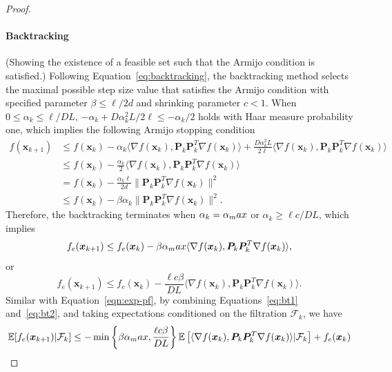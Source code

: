 \documentclass[10pt,a4paper]{amsart}
\newcommand{\Lip}{L}
\newcommand{\alphaMax}{\alpha_\textup{max}}
\begin{document}
\begin{proof}
\paragraph{Backtracking}
(Showing the existence of a feasible set such that the Armijo condition is satisfied.)
Following Equation~\eqref{eq:backtracking}, the backtracking method selects the maximal possible step size value that satisfies the Armijo condition with specified parameter $\beta \leq \ell/2d$ and shrinking parameter $c<1$. When $0\leq\alpha_k\leq \ell/D\Lip$, $-\alpha_k + D\alpha_k^2\Lip/2\ell\leq-\alpha_k/2$ holds with Haar measure probability one, which implies the following Armijo stopping condition
\begin{equation}
\begin{aligned}
f(\bm x_{k+1}) 
&\leq f(\bm x_k) -\alpha_k \langle \nabla f(\bm x_k), \bm P_k\bm P_k^T\nabla f(\bm x_k)\rangle + \frac{D\alpha_k^2\Lip}{2\ell}\langle \nabla f(\bm x_k), \bm P_k\bm P_k^T\nabla f(\bm x_k)\rangle\\
&\leq f(\bm x_k) - \frac{\alpha_k}{2}\langle \nabla f(\bm x_k), \bm P_k\bm P_k^T\nabla f(\bm x_k)\rangle\\
&= f(\bm x_k) - \frac{\alpha_k\ell}{2d}\lVert\bm P_k\bm P_k^T\nabla f(\bm x_k)\rVert^2\\
&\leq f(\bm x_k) - \beta\alpha_k\lVert\bm P_k\bm P_k^T\nabla f(\bm x_k)\rVert^2.
\end{aligned}
\end{equation}
Therefore, the backtracking terminates when $\alpha_k = \alphaMax$ or $\alpha_k \geq \ell c/D\Lip$, which implies
\begin{equation}
\label{eq:bt1}
f_e(\bm x_{k+1}) \leq f_e(\bm x_k) - \beta \alphaMax\langle \nabla f(\bm x_k), \bm P_k\bm P_k^T\nabla f(\bm x_k)\rangle,
\end{equation}
or 
\begin{equation}
\label{eq:bt2}
f_e(\bm x_{k+1}) \leq f_e(\bm x_k) - \frac{\ell c\beta}{D\Lip}\langle \nabla f(\bm x_k), \bm P_k\bm P_k^T\nabla f(\bm x_k)\rangle.
\end{equation}
Similar with Equation~\eqref{eqn:exp-pf}, by combining Equations~\eqref{eq:bt1} and~\eqref{eq:bt2}, and taking expectations conditioned on the filtration $\mathcal{F}_k$, we have
\begin{equation}
\label{eqn:pre-pl}
\begin{aligned}
\mathbb{E}[f_e(\bm x_{k+1})\vert\mathcal{F}_k]
&\leq -\min\left\{\beta \alphaMax,\frac{\ell c\beta}{D\Lip}\right\}\mathbb{E}\left[\langle\nabla f(\bm x_k),\bm P_k\bm P_k^T\nabla f(\bm x_k)\rangle\vert\mathcal{F}_k\right] + f_e(\bm x_k)\\

\end{aligned}
\end{equation}
\end{proof}
\end{document}
